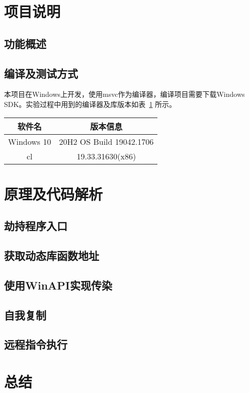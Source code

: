 \documentclass[UTF8]{ctexart}
\begin{document}
	\section{项目说明}
	\subsection{功能概述}
	
	\subsection{编译及测试方式}
	本项目在Windows上开发，使用msvc作为编译器，编译项目需要下载Windows
	SDK。实验过程中用到的编译器及库版本如表~\ref{tab:environment} 所示。
	\begin{table}[h]
		\label{tab:environment}
		\centering
		\begin{tabular}{|c|c|}
			\hline
			软件名&版本信息 \\ \hline 
			Windows 10& 20H2 OS Build 19042.1706 \\
			cl&19.33.31630(x86) \\
			\hline
		\end{tabular}
	\end{table}
	\section{原理及代码解析}
	\subsection{劫持程序入口}
	\subsection{获取动态库函数地址}
	\subsection{使用WinAPI实现传染}
	\subsection{自我复制}
	\subsection{远程指令执行}
	\section{总结}
\end{document}
